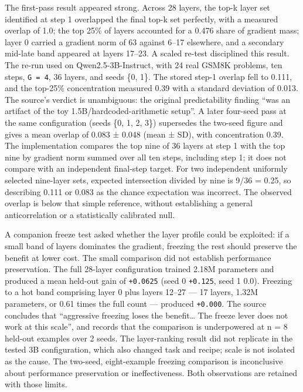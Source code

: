 \documentclass[12pt,a4paper]{report}
\DeclareRobustCommand{\longtok}[1]{\texttt{\seqsplit{#1}}}
\begin{document}
The first-pass result appeared strong. Across 28 layers, the top-k layer
set identified at step 1 overlapped the final top-k set perfectly, with
a measured overlap of 1.0; the top 25\% of layers accounted for a 0.476
share of gradient mass; layer 0 carried a gradient norm of 63 against
6--17 elsewhere, and a secondary mid-late band appeared at layers
17--23. A scaled re-test disciplined this result. The re-run used
\longtok{p1\_\allowbreak{}layer\_\allowbreak{}profile\_\allowbreak{}scaled.py} on Qwen2.5-3B-Instruct, with 24
real GSM8K problems, ten steps, \texttt{G\ =\ 4}, 36 layers, and seeds
\{0, 1\}. The stored step-1 overlap fell to 0.111, and the top-25\%
concentration measured 0.39 with a standard deviation of 0.013. The
source's verdict is unambiguous: the original predictability finding
``was an artifact of the toy 1.5B/hardcoded-arithmetic setup''. A later
four-seed pass at the same configuration (seeds \{0, 1, 2, 3\})
supersedes the two-seed figure and gives a mean overlap of 0.083 ± 0.048
(mean ± SD), with concentration 0.39. The implementation compares the
top nine of 36 layers at step 1 with the top nine by gradient norm
summed over all ten steps, including step 1; it does not compare with an
independent final-step target. For two independent uniformly selected
nine-layer sets, expected intersection divided by nine is 9/36 = 0.25,
so describing 0.111 or 0.083 as the chance expectation was incorrect.
The observed overlap is below that simple reference, without
establishing a general anticorrelation or a statistically calibrated
null.

A companion freeze test asked whether the layer profile could be
exploited: if a small band of layers dominates the gradient, freezing
the rest should preserve the benefit at lower cost. The small comparison
did not establish performance preservation. The full 28-layer
configuration trained 2.18M parameters and produced a mean held-out gain
of \texttt{+0.0625} (seed 0 \texttt{+0.125}, seed 1 0.0). Freezing to a
hot band comprising layer 0 plus layers 12--27 --- 17 layers, 1.32M
parameters, or 0.61 times the full count --- produced \texttt{+0.000}.
The source concludes that ``aggressive freezing loses the
benefit\ldots{} The freeze lever does not work at this scale'', and
records that the comparison is underpowered at n = 8 held-out examples
over 2 seeds. The layer-ranking result did not replicate in the tested
3B configuration, which also changed task and recipe; scale is not
isolated as the cause. The two-seed, eight-example freezing comparison
is inconclusive about performance preservation or ineffectiveness. Both
observations are retained with those limits.
\end{document}

